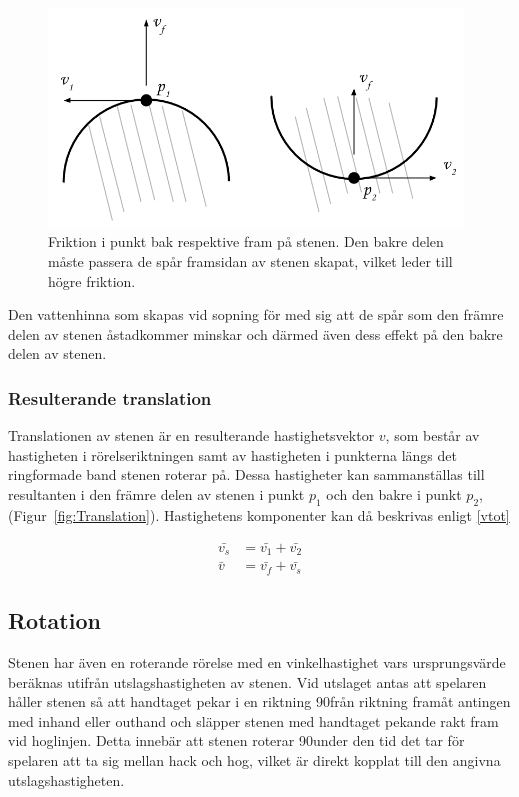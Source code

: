\documentclass[11pt]{article} %
\begin{document}
\begin{figure}[ht!]
\centering
\includegraphics[width=110mm]{Friktion_bakfram.png}
\caption{Friktion i punkt bak respektive fram på stenen. Den bakre delen måste passera de spår framsidan av stenen skapat, vilket leder till högre friktion.}
\label{fig:Friktion}
\label{overflow}
\end{figure}

Den vattenhinna som skapas vid sopning för med sig att de spår som den främre delen av stenen åstadkommer minskar och därmed  även dess effekt på den bakre delen av stenen. 

\subsubsection{Resulterande translation}

Translationen av stenen är en resulterande hastighetsvektor $v$, som består av hastigheten i rörelseriktningen samt av hastigheten i punkterna längs det ringformade band stenen roterar på. Dessa hastigheter kan sammanställas till resultanten i den främre delen av stenen i punkt $p_1$ och den bakre i punkt $p_2$, (Figur~\ref{fig:Translation}). Hastighetens komponenter kan då beskrivas enligt \eqref{vtot}

 \begin{subequations}\label{vtot}
 \begin{align}
 \bar{v_s}& = \bar{v_1}+\bar{v_2}\\
 \bar{v}&=\bar{v_f}+\bar{v_s}
 \end{align}
 \end{subequations}

\subsection{Rotation}


Stenen har även en roterande rörelse med en vinkelhastighet vars ursprungsvärde beräknas utifrån utslagshastigheten av stenen.
Vid utslaget antas att spelaren håller stenen så att handtaget pekar i en riktning 90\textdegree  från riktning framåt antingen med inhand eller outhand och släpper stenen med handtaget pekande rakt fram vid hoglinjen. Detta innebär att stenen roterar 90\textdegree under den tid det tar för spelaren att ta sig mellan hack och hog, vilket är direkt kopplat till den angivna utslagshastigheten. 
\end{document}
